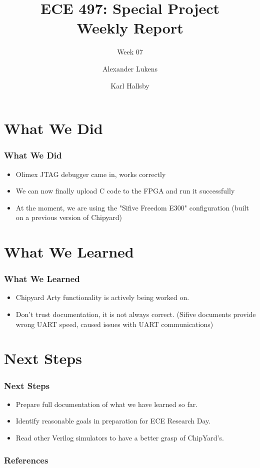 \documentclass{../weeklyslides}
\title[Weekly Report]{ECE 497: Special Project \\ Weekly Report}
\subtitle{Week 07}
\author{Alexander Lukens \and Karl Hallsby}
\institute{Illinois Institute of Technology}
\date{\DTMdisplaydate{2021}{3}{17}{-1}}
\begin{document}
\nocite{chipyard}

\begin{frame}
  \titlepage{}
\end{frame}

\section{What We Did}
\begin{frame}
	\frametitle{What We Did}
	\begin{itemize}
		\item Olimex JTAG debugger came in, works correctly
		\item We can now finally upload C code to the FPGA and run it successfully
		\item At the moment, we are using the "Sifive Freedom E300" configuration (built on a previous version of Chipyard)
	\end{itemize}
\end{frame}

\section{What We Learned}\label{sec:What_We_Learned}
\begin{frame}
	\frametitle{What We Learned}
	\begin{itemize}
		\item Chipyard Arty functionality is actively being worked on.
		\item Don't trust documentation, it is not always correct. (Sifive documents provide wrong UART speed, caused issues with UART communications)
	\end{itemize}
\end{frame}

\section{Next Steps}\label{sec:Next_Steps}
\begin{frame}
	\frametitle{Next Steps}
	\begin{itemize}
		\item Prepare full documentation of what we have learned so far.
		\item Identify reasonable goals in preparation for ECE Research Day.
		\item Read other Verilog simulators to have a better grasp of ChipYard's.
	\end{itemize}
\end{frame}

\begin{frame}
	\frametitle{References}
	\printbibliography[heading=bibintoc]{}
\end{frame}
\end{document}
